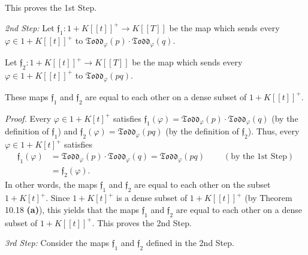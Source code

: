 \documentclass[numbers=enddot,12pt,final,onecolumn,notitlepage]{scrartcl}%
\begin{document}
This proves the 1st Step.

\textit{2nd Step:} Let $\mathfrak{f}_{1}:1+K\left[  \left[  t\right]  \right]
^{+}\rightarrow K\left[  \left[  T\right]  \right]  $ be the map which sends
every $\varphi\in1+K\left[  \left[  t\right]  \right]  ^{+}$ to
$\mathfrak{Todd}_{\varphi}\left(  p\right)  \cdot\mathfrak{Todd}_{\varphi
}\left(  q\right)  $.

Let $\mathfrak{f}_{2}:1+K\left[  \left[  t\right]  \right]  ^{+}\rightarrow
K\left[  \left[  T\right]  \right]  $ be the map which sends every $\varphi
\in1+K\left[  \left[  t\right]  \right]  ^{+}$ to $\mathfrak{Todd}_{\varphi
}\left(  pq\right)  $.

These maps $\mathfrak{f}_{1}$ and $\mathfrak{f}_{2}$ are equal to each other
on a dense subset of $1+K\left[  \left[  t\right]  \right]  ^{+}$.

\textit{Proof.} Every $\varphi\in1+K\left[  t\right]  ^{+}$ satisfies
$\mathfrak{f}_{1}\left(  \varphi\right)  =\mathfrak{Todd}_{\varphi}\left(
p\right)  \cdot\mathfrak{Todd}_{\varphi}\left(  q\right)  $ (by the definition
of $\mathfrak{f}_{1}$) and $\mathfrak{f}_{2}\left(  \varphi\right)
=\mathfrak{Todd}_{\varphi}\left(  pq\right)  $ (by the definition of
$\mathfrak{f}_{2}$). Thus, every $\varphi\in1+K\left[  t\right]  ^{+}$
satisfies%
\begin{align*}
\mathfrak{f}_{1}\left(  \varphi\right)   &  =\mathfrak{Todd}_{\varphi}\left(
p\right)  \cdot\mathfrak{Todd}_{\varphi}\left(  q\right)  =\mathfrak{Todd}%
_{\varphi}\left(  pq\right)  \ \ \ \ \ \ \ \ \ \ \left(  \text{by the 1st
Step}\right) \\
&  =\mathfrak{f}_{2}\left(  \varphi\right)  .
\end{align*}
In other words, the maps $\mathfrak{f}_{1}$ and $\mathfrak{f}_{2}$ are equal
to each other on the subset $1+K\left[  t\right]  ^{+}$. Since $1+K\left[
t\right]  ^{+}$ is a dense subset of $1+K\left[  \left[  t\right]  \right]
^{+}$ (by Theorem 10.18 \textbf{(a)}), this yields that the maps
$\mathfrak{f}_{1}$ and $\mathfrak{f}_{2}$ are equal to each other on a dense
subset of $1+K\left[  \left[  t\right]  \right]  ^{+}$. This proves the 2nd Step.

\textit{3rd Step:} Consider the maps $\mathfrak{f}_{1}$ and $\mathfrak{f}_{2}$
defined in the 2nd Step.
\end{document}
